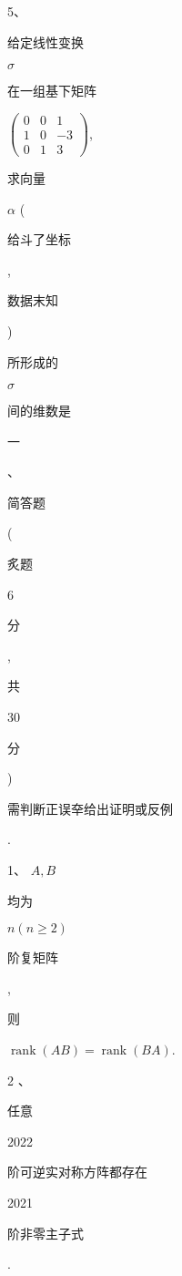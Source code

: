 \documentclass[10pt]{article}
\begin{document}
5、\begin{CJK}{UTF8}{mj}给定线性变换\end{CJK} $\sigma$ \begin{CJK}{UTF8}{mj}在一组基下矩阵\end{CJK} $\left(\begin{array}{ccc}0 & 0 & 1 \\ 1 & 0 & -3 \\ 0 & 1 & 3\end{array}\right)$, \begin{CJK}{UTF8}{mj}求向量\end{CJK} $\alpha$ (\begin{CJK}{UTF8}{mj}给斗了坐标\end{CJK}, \begin{CJK}{UTF8}{mj}数据末知\end{CJK}) \begin{CJK}{UTF8}{mj}所形成的\end{CJK} $\sigma$ \begin{CJK}{UTF8}{mj}间的维数是\end{CJK}

\begin{CJK}{UTF8}{mj}一\end{CJK}、\begin{CJK}{UTF8}{mj}简答题\end{CJK} (\begin{CJK}{UTF8}{mj}炙题\end{CJK} 6 \begin{CJK}{UTF8}{mj}分\end{CJK}, \begin{CJK}{UTF8}{mj}共\end{CJK} 30 \begin{CJK}{UTF8}{mj}分\end{CJK}) \begin{CJK}{UTF8}{mj}需判断正误㚔给出证明或反例\end{CJK}.

1、 $A, B$ \begin{CJK}{UTF8}{mj}均为\end{CJK} $n(n \geqslant 2)$ \begin{CJK}{UTF8}{mj}阶复矩阵\end{CJK}, \begin{CJK}{UTF8}{mj}则\end{CJK} $\operatorname{rank}(A B)=\operatorname{rank}(B A)$.

2 、\begin{CJK}{UTF8}{mj}任意\end{CJK} 2022 \begin{CJK}{UTF8}{mj}阶可逆实对称方阵都存在\end{CJK} 2021 \begin{CJK}{UTF8}{mj}阶非零主子式\end{CJK}.
\end{document}
